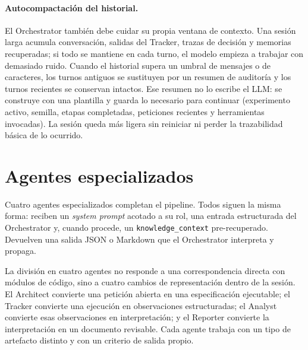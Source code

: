 \paragraph{Autocompactación del historial.} El Orchestrator también debe
cuidar su propia ventana de contexto. Una sesión larga acumula conversación,
salidas del Tracker, trazas de decisión y memorias recuperadas; si todo se
mantiene en cada turno, el modelo empieza a trabajar con demasiado ruido.
Cuando el historial supera un umbral de mensajes o de
caracteres, los turnos antiguos se sustituyen por un resumen de auditoría y
los turnos recientes se conservan intactos. Ese resumen no lo escribe el
LLM: se construye con una plantilla y guarda lo necesario para continuar
(experimento activo, semilla, etapas completadas, peticiones recientes y
herramientas invocadas). La sesión queda más ligera sin reiniciar ni
perder la trazabilidad básica de lo ocurrido.

\section{Agentes especializados}

Cuatro agentes especializados completan el pipeline. Todos siguen la
misma forma: reciben un \textit{system prompt} acotado a su rol, una
entrada estructurada del Orchestrator y, cuando procede, un
\texttt{knowledge\_context} pre-recuperado. Devuelven una salida JSON o
Markdown que el Orchestrator interpreta y propaga.

La división en cuatro agentes no responde a una correspondencia directa
con módulos de código, sino a cuatro cambios de representación dentro de
la sesión. El Architect convierte una petición abierta en una
especificación ejecutable; el Tracker convierte una ejecución en
observaciones estructuradas; el Analyst convierte esas observaciones en
interpretación; y el Reporter convierte la interpretación en un documento
revisable. Cada agente trabaja con un tipo de artefacto distinto y con un
criterio de salida propio.

